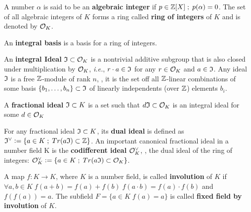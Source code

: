\documentclass[a4paper,12pt]{article}
\begin{document}
\begin{definition}
A number $\alpha$ is said to be an \textbf{algebraic integer} if $ p \in \mathbb{Z}[X] \;;\; p(\alpha) = 0$. The set of all algebraic integers of $K$ forms a ring called \textbf{ring of integers} of $K$ and is denoted by $\mathcal{O}_K$.
\end{definition}

\begin{definition}
An \textbf{integral basis} is a basis for a ring of integers. 
\end{definition}

\begin{definition}
  An \textbf{integral Ideal} $\mathfrak{I} \subset \mathcal{O}_K$ is a  nontrivial additive subgroup that
  is also closed under multiplication by $\mathcal{O}_K$, \textit{i.e.}, $r \cdot a \in \mathfrak{I}$ for
  any $r \in \mathcal{O}_K$ and $a \in \mathfrak{I}$. Any ideal $\mathfrak{I}$ is a free $\mathbb{Z}$-module of rank
  $n$, \ie, it is the set off all $\mathbb{Z}$-linear combinations of some basis
  $\{b_1,\dots,b_n\} \subset \mathfrak{I}$  of linearly independents (over $\mathbb{Z}$) elements $b_i$.
\end{definition}

\begin{definition}
  A \textbf{fractional ideal} $\mathfrak{I} \subset K$ is a set such that $d\mathfrak{I} \subset \mathcal{O}_K$ is an
  integral ideal for some $d \in \mathcal{O}_K$
\end{definition}

\begin{definition}
  For any fractional ideal $\mathfrak{I} \subset K$, its \textbf{dual ideal} is defined as
  $\mathfrak{I}^\vee \vcentcolon = \{ a \in K \;;\; Tr(a\mathfrak{I}) \subset \mathbb{Z} \}$. An important canonical
  fractional ideal in a number field K is the \textbf{codifferent ideal}
  $\mathcal{O}_K^\vee$, \ie, the dual ideal of the ring of integers: $\mathcal{O}_K^\vee \vcentcolon = \{ a \in K \;;\; Tr(a\mathfrak{I}) \subset \mathcal{O}_K \}$.
\end{definition}

    \begin{definition}
\label{def:fixed-field-by-involution}
      A map $f: K \rightarrow K$, where $K$ is a number field, is called \textbf{involution}
      of $K$ if $\forall a,b \in K \; f(a+b) = f(a) + f(b) \; f(a \cdot b) = f(a) \cdot f(b)$ and
      $f(f(a)) = a$. The subfield $F = \{a \in K \; f(a) = a\}$ is called \textbf{fixed field by
        involution} of $K$.
    \end{definition}
\end{document}
